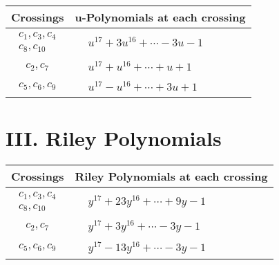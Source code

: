 \documentclass[1p]{elsarticle_modified}
\theoremstyle{definition}
\begin{document}
\begin{tabular}{m{50pt}|m{274pt}}
Crossings & \hspace{64pt}u-Polynomials at each crossing \\
\hline $$\begin{aligned}c_{1},c_{3},c_{4}\\c_{8},c_{10}\end{aligned}$$&$\begin{aligned}
&u^{17}+3 u^{16}+\cdots-3 u-1
\end{aligned}$\\
\hline $$\begin{aligned}c_{2},c_{7}\end{aligned}$$&$\begin{aligned}
&u^{17}+u^{16}+\cdots+u+1
\end{aligned}$\\
\hline $$\begin{aligned}c_{5},c_{6},c_{9}\end{aligned}$$&$\begin{aligned}
&u^{17}- u^{16}+\cdots+3 u+1
\end{aligned}$\\
\hline
\end{tabular}\newpage\renewcommand{\arraystretch}{1}
\centering \section*{ III. Riley Polynomials}
\begin{tabular}{m{50pt}|m{274pt}}
Crossings & \hspace{64pt}Riley Polynomials at each crossing \\
\hline $$\begin{aligned}c_{1},c_{3},c_{4}\\c_{8},c_{10}\end{aligned}$$&$\begin{aligned}
&y^{17}+23 y^{16}+\cdots+9 y-1
\end{aligned}$\\
\hline $$\begin{aligned}c_{2},c_{7}\end{aligned}$$&$\begin{aligned}
&y^{17}+3 y^{16}+\cdots-3 y-1
\end{aligned}$\\
\hline $$\begin{aligned}c_{5},c_{6},c_{9}\end{aligned}$$&$\begin{aligned}
&y^{17}-13 y^{16}+\cdots-3 y-1
\end{aligned}$\\
\hline
\end{tabular}
\vskip 2pc
\end{document}
